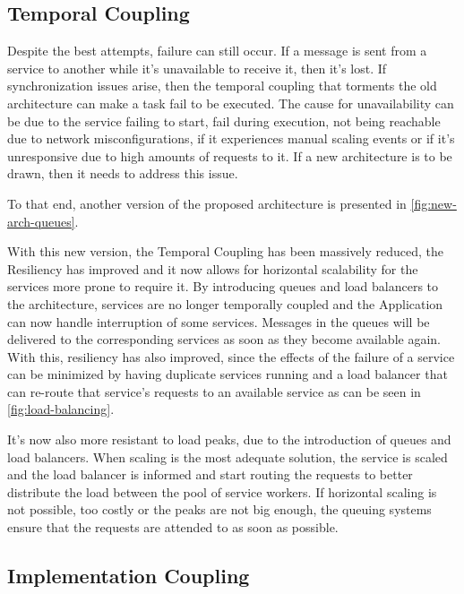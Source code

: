 \subsection{Temporal Coupling}\label{methodology:sss:temporal-coupling}

Despite the best attempts, failure can still occur. If a message is sent from a service to another while it's unavailable to receive it, then it's lost. If synchronization issues arise, then the temporal coupling that torments the old architecture can make a task fail to be executed. The cause for unavailability can be due to the service failing to start, fail during execution, not being reachable due to network misconfigurations, if it experiences manual scaling events or if it's unresponsive due to high amounts of requests to it. If a new architecture is to be drawn, then it needs to address this issue.

To that end, another version of the proposed architecture is presented in \cref{fig:new-arch-queues}. 



With this new version, the Temporal Coupling has been massively reduced, the Resiliency has improved and it now allows for horizontal scalability for the services more prone to require it.
By introducing queues and load balancers to the architecture, services are no longer temporally coupled and the Application can now handle interruption of some services. Messages in the queues will be delivered to the corresponding services as soon as they become available again. With this, resiliency has also improved, since the effects of the failure of a service can be minimized by having duplicate services running and a load balancer that can re-route that service's requests to an available service as can be seen in \cref{fig:load-balancing}. 



It's now also more resistant to load peaks, due to the introduction of queues and load balancers. When scaling is the most adequate solution, the service is scaled and the load balancer is informed and start routing the requests to better distribute the load between the pool of service workers. If horizontal scaling is not possible, too costly or the peaks are not big enough, the queuing systems ensure that the requests are attended to as soon as possible.


 

\subsection{Implementation Coupling}\label{methodology:sss:implementation-coupling}

